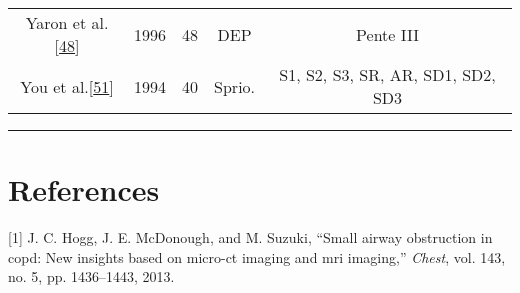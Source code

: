 \documentclass[12pt,]{article}
\begin{document}
\begin{landscape}
\begin{longtable}[]{@{}cllcc@{}}
\begin{minipage}[t]{0.31\columnwidth}\centering
Yaron et al.{[}\protect\hyperlink{ref-yaron1996utility}{48}{]}\strut
\end{minipage} & \begin{minipage}[t]{0.05\columnwidth}\raggedright
1996\strut
\end{minipage} & \begin{minipage}[t]{0.06\columnwidth}\raggedright
48\strut
\end{minipage} & \begin{minipage}[t]{0.12\columnwidth}\centering
DEP\strut
\end{minipage} & \begin{minipage}[t]{0.32\columnwidth}\centering
Pente III\strut
\end{minipage}\tabularnewline
\begin{minipage}[t]{0.31\columnwidth}\centering
You et al.{[}\protect\hyperlink{ref-you1994expiratory}{51}{]}\strut
\end{minipage} & \begin{minipage}[t]{0.05\columnwidth}\raggedright
1994\strut
\end{minipage} & \begin{minipage}[t]{0.06\columnwidth}\raggedright
40\strut
\end{minipage} & \begin{minipage}[t]{0.12\columnwidth}\centering
Sprio.\strut
\end{minipage} & \begin{minipage}[t]{0.32\columnwidth}\centering
S1, S2, S3, SR, AR, SD1, SD2, SD3\strut
\end{minipage}\tabularnewline
\bottomrule
\end{longtable}

\end{landscape}

\newpage

\begin{center}\rule{0.5\linewidth}{0.5pt}\end{center}

\hypertarget{references}{%
\section*{References}\label{references}}

\hypertarget{refs}{}
\leavevmode\hypertarget{ref-hogg2013small}{}%
{[}1{]} J. C. Hogg, J. E. McDonough, and M. Suzuki, ``Small airway
obstruction in copd: New insights based on micro-ct imaging and mri
imaging,'' \emph{Chest}, vol. 143, no. 5, pp. 1436--1443, 2013.
\end{document}
